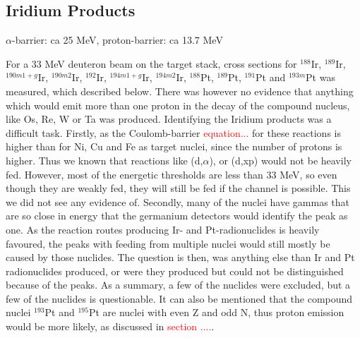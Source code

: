 \documentclass[a4paper,11pt,twoside]{book}
\begin{document}
\subsection{Iridium Products}
$\alpha$-barrier: ca 25 MeV, proton-barrier: ca 13.7 MeV

For a 33 MeV deuteron beam on the target stack, cross sections for $^{188}$Ir, $^{189}$Ir,  $^{190m1+g}$Ir, $^{190m2}$Ir, $^{192}$Ir, $^{194m1+g}$Ir, $^{194m2}$Ir, $^{188}$Pt, $^{189}$Pt, $^{191}$Pt and $^{193m}$Pt was measured, which described below. There was however no evidence that anything which would emit more than one proton in the decay of the compound nucleus, like Os, Re, W or Ta was produced. Identifying the Iridium products was a difficult task. Firstly, as the Coulomb-barrier \textcolor{red}{equation...} for these reactions is higher than for Ni, Cu and Fe as target nuclei, since the number of protons is higher. Thus we known that reactions like (d,$\alpha$), or (d,xp) would not be heavily fed. However, most of the energetic thresholds are less than 33 MeV, so even though they are weakly fed, they will still be fed if the channel is possible. This we did not see any evidence of. Secondly, many of the nuclei have gammas that are so close in energy that the germanium detectors would identify the peak as one. As the reaction routes producing Ir- and Pt-radionuclides is heavily favoured, the peaks with feeding from multiple nuclei would still mostly be caused by those nuclides. The question is then, was anything else than Ir and Pt radionuclides produced, or were they produced but could not be distinguished because of the peaks. As a summary, a few of the nuclides were excluded, but a few of the nuclides is questionable. It can also be mentioned that the compound nuclei $^{193}$Pt and $^{195}$Pt are nuclei with even Z and odd N, thus proton emission would be more likely, as discussed in \textcolor{red}{section ....}.  \\
\end{document}
